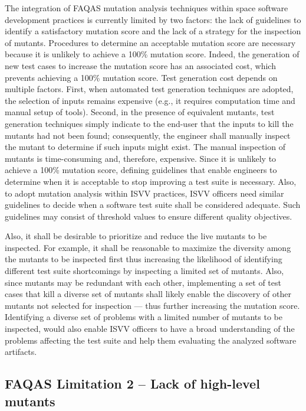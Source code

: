 The integration of FAQAS mutation analysis techniques within space software development practices is currently limited by two factors: the lack of guidelines to identify a satisfactory mutation score and the lack of a strategy for the inspection of mutants. Procedures to determine an acceptable mutation score are necessary because it is unlikely to achieve a 100\% mutation score. Indeed, the generation of new test cases to increase the mutation score has an associated cost, which prevents achieving a 100\% mutation score. Test generation cost depends on multiple factors. First, when automated test generation techniques are adopted, the selection of inputs remains expensive (e.g., it requires computation time and manual setup of tools). Second, in the presence of equivalent mutants, test generation techniques simply indicate to the end-user that the inputs to kill the mutants had not been found; consequently, the engineer shall manually inspect the mutant to determine if such inputs might exist. The manual inspection of mutants is time-consuming and, therefore, expensive. Since it is unlikely to achieve a 100\% mutation score, defining guidelines that enable engineers to determine when it is acceptable to stop improving a test suite is necessary. Also, to adopt mutation analysis within ISVV practices, ISVV officers need similar guidelines to decide when a software test suite shall be considered adequate. Such guidelines may consist of threshold values to ensure different quality objectives.

Also, it shall be desirable to prioritize and reduce the live mutants to be inspected. For example, it shall be reasonable to maximize the diversity among the mutants to be inspected first thus increasing the likelihood of identifying different test suite shortcomings by inspecting a limited set of mutants. Also, since mutants may be redundant with each other, implementing a set of test cases that kill a diverse set of mutants shall likely enable the discovery of other mutants not selected for inspection --- thus further increasing the mutation score. Identifying a diverse set of problems with a limited number of mutants to be inspected, would also enable ISVV officers to have a broad understanding of the problems affecting the test suite and help them evaluating the analyzed software artifacts.

\subsection*{FAQAS Limitation 2 – Lack of high-level mutants}

